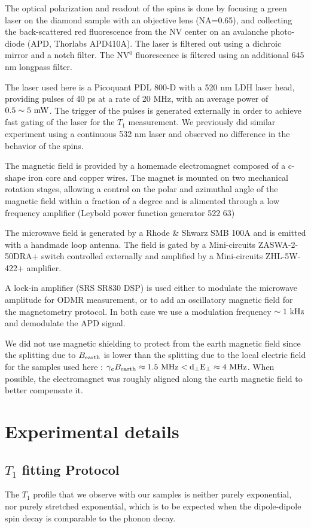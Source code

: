 \documentclass[preprintnumbers,amsmath,amssymb,onecolumn,12pt]{revtex4-2}\usepackage{graphicx}%
\begin{document}
The optical polarization and readout of the spins is done by focusing a green laser on the diamond sample with an objective lens (NA=0.65), and collecting the back-scattered red fluorescence from the NV center on an avalanche photo-diode (APD, Thorlabs APD410A). The laser is filtered out using a dichroic mirror and a notch filter. The NV$^0$ fluorescence is filtered using an additional 645 nm longpass filter.

The laser used here is a Picoquant PDL 800-D with a 520 nm LDH laser head, providing pulses of 40 ps at a rate of 20 MHz, with an average power of $0.5 \sim 5\ \rm mW$. The trigger of the pulses is generated externally in order to achieve fast  gating of the laser for the $T_1$ measurement. We previously did similar experiment using a continuous 532 nm laser and observed no difference in the behavior of the spins.

The magnetic field is provided by a homemade electromagnet composed of a c-shape iron core and  copper wires. The magnet is mounted on two mechanical rotation stages, allowing a control on the polar and azimuthal angle of the magnetic field within a fraction of a degree and is alimented through a low frequency amplifier (Leybold power function generator 522 63)

The microwave field is generated by a Rhode \& Shwarz SMB 100A and is emitted with a handmade loop antenna. The field is gated by a Mini-circuits ZASWA-2-50DRA+ switch controlled externally and amplified by a Mini-circuits ZHL-5W-422+ amplifier.

A lock-in amplifier (SRS SR830 DSP) is used either to modulate the microwave amplitude for ODMR measurement, or to add an oscillatory magnetic field for the magnetometry protocol. In both case we use a modulation frequency $\sim 1\ \rm kHz$ and demodulate the APD signal.

We did not use magnetic shielding to protect from the earth magnetic field since the splitting due to  $B_{\rm earth}$ is lower than the splitting due to the local electric field for the samples used here : $ \gamma_e B_{\rm earth} \approx 1.5\ \rm MHz < d_\perp E_\perp \approx 4\ \rm MHz$. 
When possible, the electromagnet was roughly aligned along the earth magnetic field to better compensate it.
\section{Experimental details}
\subsection{$T_1$ fitting Protocol}
The $T_1$ profile that we observe with our samples is neither purely exponential, nor purely stretched exponential, which is to be expected when the dipole-dipole spin decay is comparable to the phonon decay.
\end{document}
